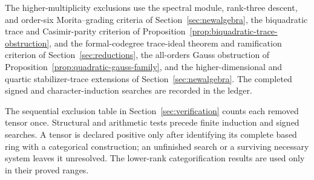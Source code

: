 The higher-multiplicity exclusions use the spectral
module, rank-three descent, and order-six Morita--grading criteria of
Section~\ref{sec:newalgebra}, the biquadratic trace and Casimir-parity
criterion of Proposition~\ref{prop:biquadratic-trace-obstruction}, and
the formal-codegree trace-ideal theorem and ramification criterion of
Section~\ref{sec:reductions}, the all-orders Gauss obstruction of
Proposition~\ref{prop:quadratic-gauss-family}, and the higher-dimensional and
quartic stabilizer-trace extensions of Section~\ref{sec:newalgebra}.
The completed signed and character-induction searches are recorded in the ledger.

The sequential exclusion table in Section~\ref{sec:verification} counts
each removed tensor once. Structural and arithmetic tests precede finite
induction and signed searches. A tensor is declared positive only after
identifying its complete based ring with a categorical construction; an
unfinished search or a surviving necessary system leaves it unresolved.
The lower-rank categorification results are used only in their proved
ranges.
